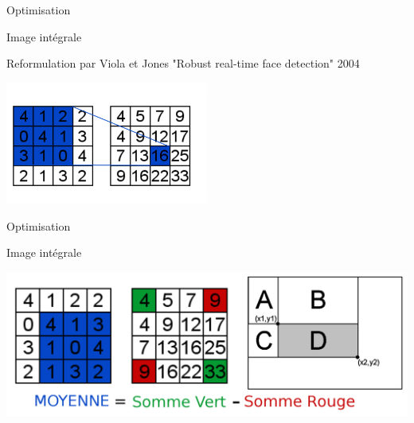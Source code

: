 \documentclass[t,14pt]{beamer}
\begin{document}
\begin{frame}{Optimisation}
\vspace{5mm}
\begin{block}{}
Image intégrale
\end{block}
Reformulation par Viola et Jones "Robust real-time face detection" 2004\\
\begin{center}
\includegraphics[width=0.5\textwidth]{images/imageIntegrale1.png}
\end{center}
\end{frame}

\begin{frame}{Optimisation}
\vspace{5mm}
\begin{block}{}
Image intégrale
\end{block}
\begin{center}
\includegraphics[width=\textwidth]{images/imageIntegrale.png}
\end{center}

\end{frame}

\end{document}

